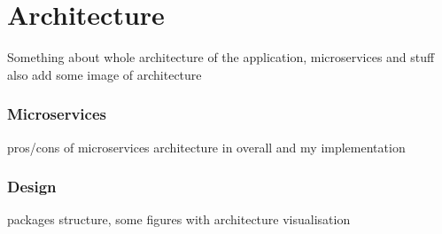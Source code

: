 \section{Architecture}
Something about whole architecture of the application, microservices and stuff
also add some image of architecture
\subsubsection{Microservices}
pros/cons of microservices architecture in overall and my implementation

\subsubsection{Design}
packages structure, some figures with architecture visualisation

